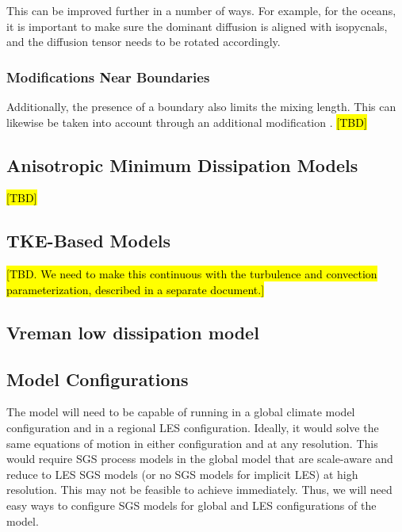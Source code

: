 \documentclass{report}
\begin{document}
This can be improved further in a number of ways. For example, for the oceans, it is important to make sure the dominant diffusion is aligned with isopycnals, and the diffusion tensor needs to be rotated accordingly. 

\subsubsection{Modifications Near Boundaries}
 
Additionally, the presence of a boundary also limits the mixing length. This can likewise be taken into account through an additional modification \citep{Kleissl03a}.  \hl{[TBD]}

\subsection{Anisotropic Minimum Dissipation Models}

\hl{[TBD]}
\citep{Abkar17a}

\subsection{TKE-Based Models}

\citep{Deardorff80a}

\hl{[TBD. We need to make this continuous with the turbulence and convection parameterization, described in a separate document.]}

\subsection{Vreman low dissipation model }

\citep{vreman2004}

\subsection{Model Configurations} 

The model will need to be capable of running in a global climate model configuration and in a regional LES configuration. Ideally, it would solve the same equations of motion in either configuration and at any resolution. This would require SGS process models in the global model that are scale-aware and reduce to LES SGS models (or no SGS models for implicit LES) at high resolution. This may not be feasible to achieve immediately. Thus, we will need easy ways to configure SGS models for global and LES configurations of the model. 
\end{document}
